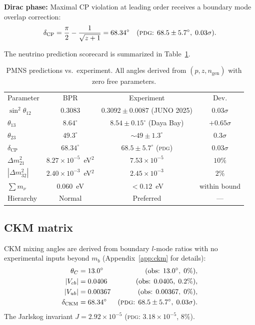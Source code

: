 \documentclass[aps,prd,twocolumn,superscriptaddress,longbibliography,nofootinbib]{revtex4-2}
\begin{document}
\textbf{Dirac phase:} Maximal CP violation at leading order receives a
boundary mode overlap correction:
\begin{equation}
\delta_{\mathrm{CP}} = \frac{\pi}{2} - \frac{1}{\sqrt{z+1}}
= 68.34^\circ
\label{eq:dcp}
\quad (\text{\textsc{pdg}: }68.5 \pm 5.7^\circ,\; 0.03\sigma).
\end{equation}

The neutrino prediction scorecard is summarized in Table~\ref{tab:pmns}.

\begin{table}[h]
\caption{\label{tab:pmns}%
PMNS predictions vs.\ experiment.  All angles derived from
$(p, z, n_{\mathrm{gen}})$ with zero free parameters.}
\begin{ruledtabular}
\begin{tabular}{lccc}
Parameter & BPR & Experiment & Dev.\\
\colrule
$\sin^2\theta_{12}$ & 0.3083 & $0.3092\pm0.0087$ (JUNO 2025) & $0.03\sigma$ \\
$\theta_{13}$ & $8.64^\circ$ & $8.54\pm0.15^\circ$ (Daya Bay) & $+0.65\sigma$ \\
$\theta_{23}$ & $49.3^\circ$ & $\sim49\pm1.3^\circ$ & $0.3\sigma$ \\
$\delta_{\mathrm{CP}}$ & $68.34^\circ$ & $68.5\pm5.7^\circ$ (\textsc{pdg}) & $0.03\sigma$ \\
$\Delta m^2_{21}$ & $8.27\times10^{-5}$~eV$^2$ & $7.53\times10^{-5}$ & $10\%$ \\
$|\Delta m^2_{32}|$ & $2.40\times10^{-3}$~eV$^2$ & $2.45\times10^{-3}$ & $2\%$ \\
$\sum m_\nu$ & $0.060$~eV & $< 0.12$~eV & within bound \\
Hierarchy & Normal & Preferred & --- \\
\end{tabular}
\end{ruledtabular}
\end{table}

\subsection{CKM matrix}

CKM mixing angles are derived from boundary $l$-mode ratios with no
experimental inputs beyond $m_b$ (Appendix~\ref{app:ckm} for details):
\begin{align}
\theta_C &= 13.0^\circ &(\text{obs: }13.0^\circ,\; 0\%), \\
|V_{cb}| &= 0.0406 &(\text{obs: }0.0405,\; 0.2\%), \\
|V_{ub}| &= 0.00367 &(\text{obs: }0.00367,\; 0\%), \\
\delta_{\mathrm{CKM}} &= 68.34^\circ &(\text{\textsc{pdg}: }68.5\pm5.7^\circ,\; 0.03\sigma).
\end{align}
The Jarlskog invariant $J = 2.92 \times 10^{-5}$
(\textsc{pdg}: $3.18\times10^{-5}$, $8\%$).
\end{document}
